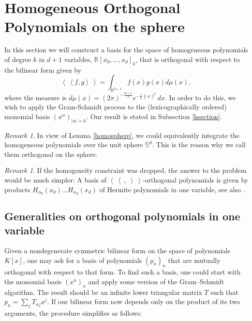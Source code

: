 \documentclass{amsart}
\newcommand{\bra}{\left<\!\!\!\:\left<}
\newcommand{\ket}{\right>\!\!\!\:\right>}
\newcommand{\R}{\mathbb{R}}
\renewcommand{\S}{\mathbb{S}}
\theoremstyle{plain}
\theoremstyle{definition}
\theoremstyle{remark}
\newtheorem{remark}[theorem]{Remark}
\begin{document}
\section{Homogeneous Orthogonal Polynomials on the sphere}
In this section we will construct a basis for the space of homogeneous polynomials of degree $k$ in $d+1$ variables, $\R[x_0,\ldots,x_d]_k$, that is orthogonal with respect to the bilinear form given by
\begin{equation*}
 \bra f,g\ket = \int_{\R^{d+1}}f(x)g(x) d\mu(x),
\end{equation*}
where the measure is $d\mu(x) = (2\pi)^{-\frac{d+1}{2}}e^{-\frac{1}{2}\|x\|^2}dx$. In order to do this, we wish to apply the Gram-Schmidt process to the (lexicographically ordered) monomial basis $(x^\alpha)_{|\alpha |=k}$. Our result is stated in Subsection \ref{hsection}. 
\begin{remark}
In view of Lemma \ref{homosphere}, we could equivalently integrate the homogeneous polynomials over the unit sphere $\S^d$. This is the reason why we call them orthogonal on the sphere.
\end{remark}
\begin{remark}
 If the homogeneity constraint was dropped, the answer to the problem would be much simpler: A basis of $ \bra\ ,\;\ket$-orthogonal polynomials is given by products $H_{\alpha_0}\!(x_0)\ldots H_{\alpha_d}\!(x_d)$ of Hermite polynomials in one variable, see also \cite[Sect.~2.3.4]{Dunkl}.
\end{remark}



\subsection{Generalities on orthogonal polynomials in one variable}
Given a nondegenerate symmetric bilinear form on the space of polynomials $K[x]$, one may ask for a basis of polynomials $(p_n)_n$ that are mutually orthogonal with respect to that form. To find such a basis, one could start with the monomial basis $(x^n)_n$ and apply some version of the Gram--Schmidt algorithm. The result should be an infinite lower triangular matrix $T$ such that $p_n =\sum_j T_{nj} x^j$. If our bilinear form now depends only on the product of its two arguments, the procedure simplifies as follows:
\end{document}
